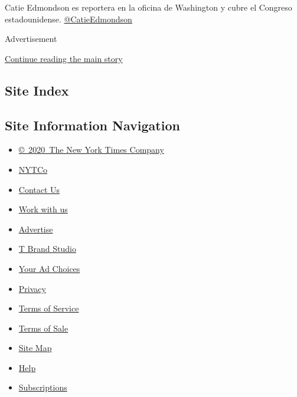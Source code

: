 Catie Edmondson es reportera en la oficina de Washington y cubre el
Congreso estadounidense.
\href{https://twitter.com/CatieEdmondson}{@CatieEdmondson}

Advertisement

\protect\hyperlink{after-bottom}{Continue reading the main story}

\hypertarget{site-index}{%
\subsection{Site Index}\label{site-index}}

\hypertarget{site-information-navigation}{%
\subsection{Site Information
Navigation}\label{site-information-navigation}}

\begin{itemize}
\tightlist
\item
  \href{https://help.nytimes.com/hc/en-us/articles/115014792127-Copyright-notice}{©~2020~The
  New York Times Company}
\end{itemize}

\begin{itemize}
\tightlist
\item
  \href{https://www.nytco.com/}{NYTCo}
\item
  \href{https://help.nytimes.com/hc/en-us/articles/115015385887-Contact-Us}{Contact
  Us}
\item
  \href{https://www.nytco.com/careers/}{Work with us}
\item
  \href{https://nytmediakit.com/}{Advertise}
\item
  \href{http://www.tbrandstudio.com/}{T Brand Studio}
\item
  \href{https://www.nytimes.com/privacy/cookie-policy\#how-do-i-manage-trackers}{Your
  Ad Choices}
\item
  \href{https://www.nytimes.com/privacy}{Privacy}
\item
  \href{https://help.nytimes.com/hc/en-us/articles/115014893428-Terms-of-service}{Terms
  of Service}
\item
  \href{https://help.nytimes.com/hc/en-us/articles/115014893968-Terms-of-sale}{Terms
  of Sale}
\item
  \href{https://spiderbites.nytimes.com}{Site Map}
\item
  \href{https://help.nytimes.com/hc/en-us}{Help}
\item
  \href{https://www.nytimes.com/subscription?campaignId=37WXW}{Subscriptions}
\end{itemize}
